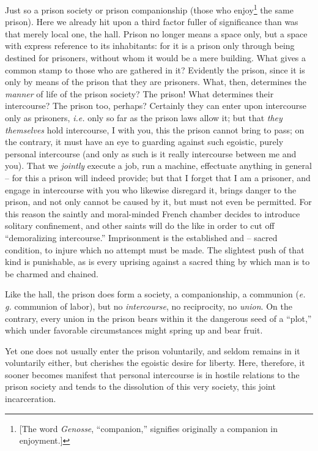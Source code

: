 \documentclass[12pt,a4paper]{book}
\begin{document}
Just so a prison society or prison companionship (those who 
enjoy\footnote{[The word \textit{Genosse}, ``companion,'' signifies 
originally a companion in enjoyment.]} the same prison). Here we already hit 
upon a third factor fuller of significance than was that merely local one, the 
hall. Prison no longer means a space only, but a space with express reference 
to its inhabitants: for it is a prison only through being destined for 
prisoners, without whom it would be a mere building. What gives a common stamp 
to those who are gathered in it? Evidently the prison, since it is only by 
means of the prison that they are prisoners. What, then, determines the 
\textit{manner} of life of the prison society? The prison! What determines 
their intercourse? The prison too, perhaps? Certainly they can enter upon 
intercourse only as prisoners, \textit{i.e.} only so far as the prison laws 
allow it; but that \textit{they themselves} hold intercourse, I with you, this 
the prison cannot bring to pass; on the contrary, it must have an eye to 
guarding against such egoistic, purely personal intercourse (and only as such 
is it really intercourse between me and you). That we \textit{jointly} execute 
a job, run a machine, effectuate anything in general -- for this a prison will 
indeed provide; but that I forget that I am a prisoner, and engage in 
intercourse with you who likewise disregard it, brings danger to the prison, 
and not only cannot be caused by it, but must not even be permitted. For this 
reason the saintly and moral-minded French chamber decides to introduce 
solitary confinement, and other saints will do the like in order to cut off 
``demoralizing intercourse.'' Imprisonment is the established and -- sacred 
condition, to injure which no attempt must be made. The slightest push of that 
kind is punishable, as is every uprising against a sacred thing by which man 
is to be charmed and chained.

Like the hall, the prison does form a society, a companionship, a communion 
(\textit{e. g.} communion of labor), but no \textit{intercourse}, no 
reciprocity, no \textit{union}. On the contrary, every union in the prison 
bears within it the dangerous seed of a ``plot,'' which under favorable 
circumstances might spring up and bear fruit.

Yet one does not usually enter the prison voluntarily, and seldom remains in 
it voluntarily either, but cherishes the egoistic desire for liberty. Here, 
therefore, it sooner becomes manifest that personal intercourse is in hostile 
relations to the prison society and tends to the dissolution of this very 
society, this joint incarceration.
\end{document}
